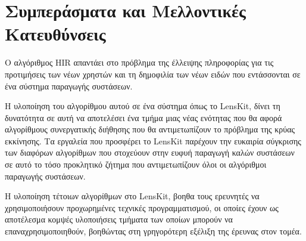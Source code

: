 \chapter{Συμπεράσματα και Μελλοντικές Κατευθύνσεις}
\label{Chapter6}
Ο αλγόριθμος {\en HIR} απαντάει στο πρόβλημα της έλλειψης πληροφορίας για τις προτιμήσεις των νέων χρηστών και τη δημοφιλία των νέων ειδών που εντάσσονται σε ένα σύστημα παραγωγής συστάσεων. \par
Η υλοποίηση του αλγορίθμου αυτού σε ένα σύστημα όπως το {\en LensKit}, δίνει τη δυνατότητα σε αυτή να αποτελέσει ένα τμήμα μιας νέας ενότητας που θα αφορά αλγορίθμους συνεργατικής διήθησης που θα αντιμετωπίζουν το πρόβλημα της κρύας εκκίνησης. Τα εργαλεία που προσφέρει το {\en LensKit} παρέχουν την ευκαιρία σύγκρισης των διαφόρων αλγορίθμων που στοχεύουν στην ευφυή παραγωγή καλών συστάσεων σε αυτό το τόσο προκλητικό ζήτημα που αντιμετωπίζουν όλοι οι αλγόριθμοι παραγωγής συστάσεων.\par
Η υλοποίηση τέτοιων αλγορίθμων στο {\en LensKit}, βοηθα τους ερευνητές να χρησιμοποιήσουν προχωρημένες τεχνικές προγραμματισμού, οι οποίες έχουν ως αποτέλεσμα κομψές υλοποιήσεις τμήματα των οποίων μπορούν να επαναχρησιμοποιηθούν, βοηθώντας στη γρηγορότερη εξέλιξη της έρευνας στον τομέα.